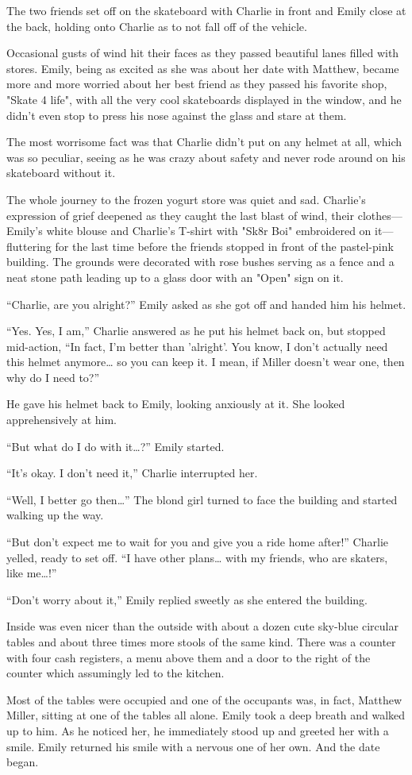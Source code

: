 The two friends set off on the skateboard with Charlie in front and Emily close at the back, holding onto Charlie as to not fall off of the vehicle.

Occasional gusts of wind hit their faces as they passed beautiful lanes filled with stores. Emily, being as excited as she was about her date with Matthew, became more and more worried about her best friend as they passed his favorite shop, "Skate 4 life", with all the very cool skateboards displayed in the window, and he didn't even stop to press his nose against the glass and stare at them.

The most worrisome fact was that Charlie didn't put on any helmet at all, which was so peculiar, seeing as he was crazy about safety and never rode around on his skateboard without it.

The whole journey to the frozen yogurt store was quiet and sad. Charlie's expression of grief deepened as they caught the last blast of wind, their clothes—Emily's white blouse and Charlie's T-shirt with "Sk8r Boi" embroidered on it—fluttering for the last time before the friends stopped in front of the pastel-pink building. The grounds were decorated with rose bushes serving as a fence and a neat stone path leading up to a glass door with an "Open" sign on it.

“Charlie, are you alright?” Emily asked as she got off and handed him his helmet.

“Yes. Yes, I am,” Charlie answered as he put his helmet back on, but stopped mid-action, “In fact, I'm better than 'alright'. You know, I don't actually need this helmet anymore… so you can keep it. I mean, if Miller doesn't wear one, then why do I need to?”

He gave his helmet back to Emily, looking anxiously at it. She looked apprehensively at him.

“But what do I do with it…?” Emily started.

“It's okay. I don't need it,” Charlie interrupted her.

“Well, I better go then…” The blond girl turned to face the building and started walking up the way.

“But don't expect me to wait for you and give you a ride home after!” Charlie yelled, ready to set off. “I have other plans… with my friends, who are skaters, like me…!”

“Don't worry about it,” Emily replied sweetly as she entered the building.

Inside was even nicer than the outside with about a dozen cute sky-blue circular tables and about three times more stools of the same kind. There was a counter with four cash registers, a menu above them and a door to the right of the counter which assumingly led to the kitchen.

Most of the tables were occupied and one of the occupants was, in fact, Matthew Miller, sitting at one of the tables all alone. Emily took a deep breath and walked up to him. As he noticed her, he immediately stood up and greeted her with a smile. Emily returned his smile with a nervous one of her own. And the date began.